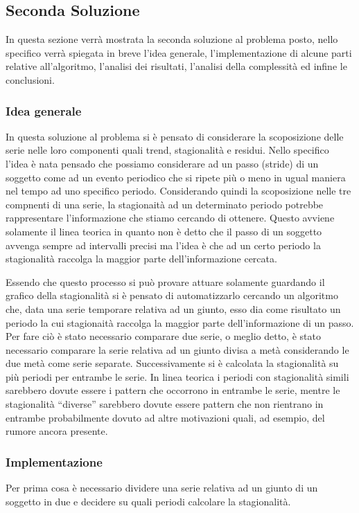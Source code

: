 \subsection{Seconda Soluzione}
In questa sezione verrà mostrata la seconda soluzione al problema posto, nello
specifico verrà spiegata in breve l’idea generale, l’implementazione di alcune parti relative all'algoritmo, 
l’analisi dei risultati, l’analisi della complessità ed infine
le conclusioni.

\subsubsection{Idea generale}
In questa soluzione al problema si è pensato di considerare la scoposizione delle serie nelle 
loro componenti quali trend, stagionalità e residui. Nello specifico l'idea è nata
pensado che possiamo considerare ad un passo (stride) di un soggetto come ad un evento periodico
che si ripete più o meno in ugual maniera nel tempo ad uno specifico periodo. Considerando quindi
la scoposizione nelle tre compnenti di una serie, la stagionaità ad un determinato periodo potrebbe
rappresentare l'informazione che stiamo cercando di ottenere. Questo avviene solamente il linea teorica
in quanto non è detto che il passo di un soggetto avvenga sempre ad intervalli precisi ma l'idea è che
ad un certo periodo la stagionalità raccolga la maggior parte dell'informazione cercata.

Essendo che questo processo si può provare attuare solamente guardando il grafico della stagionalità
si è pensato di automatizzarlo cercando un algoritmo che, data una serie temporare relativa ad un giunto,
esso dia come risultato un periodo
la cui stagionaità raccolga la maggior parte dell'informazione di un passo. Per fare ciò è stato 
necessario comparare due serie, o meglio detto, è stato necessario comparare la serie relativa 
ad un giunto divisa a metà considerando le due metà come serie separate. Successivamente
si è calcolata la stagionalità su più periodi per entrambe le serie. In linea teorica i periodi con
stagionalità simili sarebbero dovute essere i pattern che occorrono in entrambe le serie,
mentre le stagionalità ``diverse'' sarebbero dovute essere pattern che non rientrano 
in entrambe probabilmente dovuto ad altre motivazioni quali, ad esempio, del rumore ancora presente.





\subsubsection{Implementazione}
Per prima cosa è necessario dividere una serie relativa ad un giunto di un soggetto in due e decidere
su quali periodi calcolare la stagionalità.

